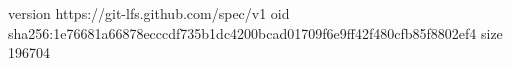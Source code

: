 version https://git-lfs.github.com/spec/v1
oid sha256:1e76681a66878ecccdf735b1dc4200bcad01709f6e9ff42f480cfb85f8802ef4
size 196704
